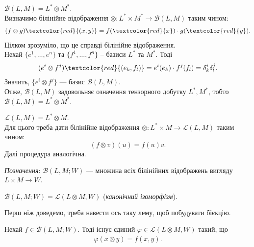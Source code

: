 \documentclass{math_library}
\begin{document}
\begin{example}
$\mathcal{B}(L,M) = L^* \otimes M^*$.
\bigskip \\
Визначимо білінійне відображення $\otimes \colon L^* \times M^* \to \mathcal{B}(L,M)$ таким чином: 
\[
(f \otimes g)\textcolor{red}{(x,y)} = f(\textcolor{red}{x}) \cdot g(\textcolor{red}{y}).
\]
Цілком зрозуміло, що це справді білінійне відображення.\\
Нехай $\{e^1,\dots,e^n\}$ та $\{f^1,\dots,f^n\}$ -- базиси $L^*$ та $M^*$. Тоді
\[
(e^i \otimes f^j)\textcolor{red}{(e_k,f_l)} = e^i(e_k) \cdot f^j(f_l) = \delta^i_k \delta^j_l.
\]
Значить, $\{e^i \otimes f^j\}$ --- базис $\mathcal{B}(L,M)$.\\
Отже, $\mathcal{B}(L,M)$ задовольняє означення тензорного добутку $L^*,M^*$, тобто $\mathcal{B}(L,M) = L^* \otimes M^*$.
\end{example}

\begin{example}
$\mathcal{L}(L,M) = L^* \otimes M$.
\bigskip \\
Для цього треба дати білінійне відображення $\otimes \colon L^* \times M \to \mathcal{L}(L,M)$ таким чином: 
\[
(f \otimes v)(u) = f(u)v.
\]
Далі процедура аналогічна.
\end{example}
\noindent
\textit{Позначення}: $\mathcal{B}(L,M; W)$ --- множина всіх білінійних відображень вигляду $L \times M \to W$.

\begin{proposition}
$\mathcal{B}(L,M; W) = \mathcal{L}(L \otimes M, W)$ (\textit{канонічний ізоморфізм}).
\end{proposition}

Перш ніж доведемо, треба навести ось таку лему, щоб побудувати бієкцію.

\begin{lemma}
Нехай $f \in \mathcal{B}(L,M; W)$. Тоді існує єдиний $\varphi \in \mathcal{L}(L \otimes M, W)$ такий, що
\begin{align*}
\varphi(x \otimes y) = f(x,y).
\end{align*}
\end{lemma}
\end{document}
